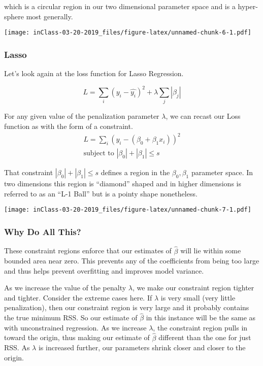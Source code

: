 \documentclass[]{article}
\begin{document}
which is a circular region in our two dimensional parameter space and is
a hyper-sphere most generally.

\texttt{[image: inClass-03-20-2019\_files/figure-latex/unnamed-chunk-6-1.pdf]}

\subsubsection{Lasso}\label{lasso-1}

Let's look again at the loss function for Lasso Regression.

\[
L = \sum_i (y_i - \hat{y_i})^2 + \lambda \sum_j |\beta_j|
\]

For any given value of the penalization parameter \(\lambda\), we can
recast our Loss function as with the form of a constraint. \[
\begin{aligned}
L = \sum_i (y_i - (\beta_0 + \beta_1 x_i))^2  \\
\textrm{subject to } |\beta_0| + |\beta_1| \le s
\end{aligned}
\]

That constraint \(|\beta_0| + |\beta_1| \le s\) defines a region in the
\(\beta_0, \beta_1\) parameter space. In two dimensions this region is
``diamond'' shaped and in higher dimensions is referred to as an ``L-1
Ball'' but is a pointy shape nonetheless.

\texttt{[image: inClass-03-20-2019\_files/figure-latex/unnamed-chunk-7-1.pdf]}

\subsubsection{Why Do All This?}\label{why-do-all-this}

These constraint regions enforce that our estimates of \(\hat{\beta}\)
will lie within some bounded area near zero. This prevents any of the
coefficients from being too large and thus helps prevent overfitting and
improves model variance.

As we increase the value of the penalty \(\lambda\), we make our
constraint region tighter and tighter. Consider the extreme cases here.
If \(\lambda\) is very small (very little penalization), then our
constraint region is very large and it probably contains the true
minimum RSS. So our estimate of \(\hat{\beta}\) in this instance will be
the same as with unconstrained regression. As we increase \(\lambda\),
the constraint region pulls in toward the origin, thus making our
estimate of \(\hat{\beta}\) different than the one for just RSS. As
\(\lambda\) is increased further, our parameters shrink closer and
closer to the origin.
\end{document}
